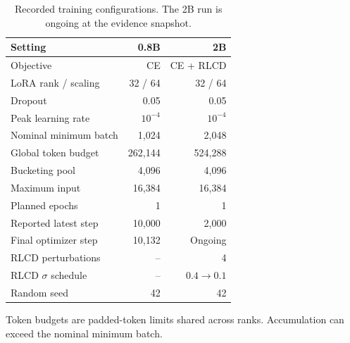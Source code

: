 \begin{table}[t]
\centering
\footnotesize
\setlength{\tabcolsep}{4pt}
\caption{Recorded training configurations. The 2B run is ongoing at the evidence snapshot.}
\label{tab:training}
\begin{tabular}{p{}rr}
\toprule
Setting & 0.8B & 2B \\
\midrule
Objective & CE & CE + RLCD \\
LoRA rank / scaling & 32 / 64 & 32 / 64 \\
Dropout & 0.05 & 0.05 \\
Peak learning rate & $10^{-4}$ & $10^{-4}$ \\
Nominal minimum batch & 1,024 & 2,048 \\
Global token budget & 262,144 & 524,288 \\
Bucketing pool & 4,096 & 4,096 \\
Maximum input & 16,384 & 16,384 \\
Planned epochs & 1 & 1 \\
Reported latest step & 10,000 & 2,000 \\
Final optimizer step & 10,132 & Ongoing \\
RLCD perturbations & -- & 4 \\
RLCD $\sigma$ schedule & -- & $0.4\to0.1$ \\
Random seed & 42 & 42 \\
\bottomrule
\end{tabular}
\par\vspace{3pt}\begin{minipage}{\columnwidth}\footnotesize Token budgets are padded-token limits shared across ranks. Accumulation can exceed the nominal minimum batch.\end{minipage}
\end{table}
